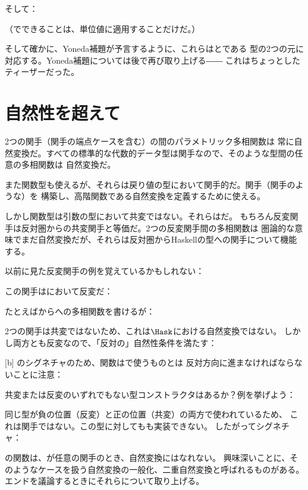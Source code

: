 そして：

（でできることは、単位値\code{()}に適用することだけだ。）

そして確かに、Yoneda補題が予言するように、これらはとである
型の2つの元に対応する。Yoneda補題については後で再び取り上げる――
これはちょっとしたティーザーだった。

\section{自然性を超えて}

2つの関手（関手の端点ケースを含む）の間のパラメトリック多相関数は
常に自然変換だ。すべての標準的な代数的データ型は関手なので、そのような型間の任意の多相関数は
自然変換だ。

また関数型も使えるが、それらは戻り値の型において関手的だ。関手（関手のような）を
構築し、高階関数である自然変換を定義するために使える。

しかし関数型は引数の型において共変ではない。それらはだ。
もちろん反変関手は反対圏からの共変関手と等価だ。2つの反変関手間の多相関数は
圏論的な意味でまだ自然変換だが、それらは反対圏からHaskellの型への関手について機能する。

以前に見た反変関手の例を覚えているかもしれない：

この関手はにおいて反変だ：

たとえばからへの多相関数を書けるが：

2つの関手は共変ではないため、これは$\Hask$における自然変換ではない。
しかし両方とも反変なので、「反対の」自然性条件を満たす：

[b]
のシグネチャのため、関数はで使うものとは
反対方向に進まなければならないことに注意：

共変または反変のいずれでもない型コンストラクタはあるか？例を挙げよう：

同じ型が負の位置（反変）と正の位置（共変）の両方で使われているため、
これは関手ではない。この型に対してもも実装できない。
したがってシグネチャ：

の関数は、が任意の関手のとき、自然変換にはなれない。
興味深いことに、そのようなケースを扱う自然変換の一般化、二重自然変換と呼ばれるものがある。
エンドを議論するときにそれらについて取り上げる。

